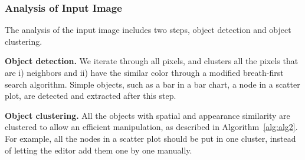 \subsubsection{Analysis of Input Image}
The analysis of the input image includes two steps, object detection and object clustering.

\noindent
\textbf{Object detection.} We iterate through all pixels, and clusters all the pixels that are i) neighbors and ii) have the similar color through a modified breath-first search algorithm. Simple objects, such as a bar in a bar chart, a node in a scatter plot, are detected and extracted after this step.

\noindent
\textbf{Object clustering.} All the objects with spatial and appearance similarity are clustered to allow an efficient manipulation, as described in Algorithm~\ref{alg:alg2}. For example, all the nodes in a scatter plot should be put in one cluster, instead of letting the editor add them one by one manually.     

